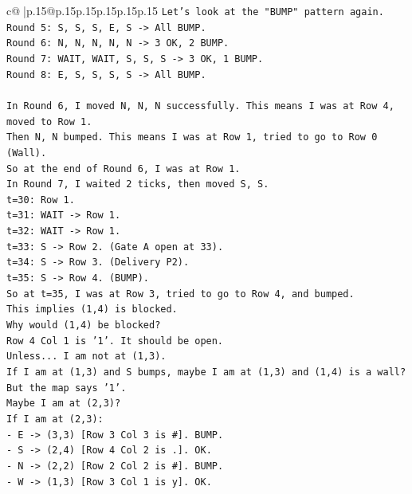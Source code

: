 \documentclass{article}
\begin{document}
{\begin{supertabular}{c@{$\;$}|p{.15\linewidth}@{}p{.15\linewidth}p{.15\linewidth}p{.15\linewidth}p{.15\linewidth}p{.15\linewidth}}
{{{\texttt{Let's look at the "BUMP" pattern again.} \\
\texttt{Round 5: S, S, S, E, S {-}> All BUMP.} \\
\texttt{Round 6: N, N, N, N, N {-}> 3 OK, 2 BUMP.} \\
\texttt{Round 7: WAIT, WAIT, S, S, S {-}> 3 OK, 1 BUMP.} \\
\texttt{Round 8: E, S, S, S, S {-}> All BUMP.} \\
\\ 
\texttt{In Round 6, I moved N, N, N successfully. This means I was at Row 4, moved to Row 1.} \\
\texttt{Then N, N bumped. This means I was at Row 1, tried to go to Row 0 (Wall).} \\
\texttt{So at the end of Round 6, I was at Row 1.} \\
\texttt{In Round 7, I waited 2 ticks, then moved S, S.} \\
\texttt{t=30: Row 1.} \\
\texttt{t=31: WAIT {-}> Row 1.} \\
\texttt{t=32: WAIT {-}> Row 1.} \\
\texttt{t=33: S {-}> Row 2. (Gate A open at 33).} \\
\texttt{t=34: S {-}> Row 3. (Delivery P2).} \\
\texttt{t=35: S {-}> Row 4. (BUMP).} \\
\texttt{So at t=35, I was at Row 3, tried to go to Row 4, and bumped.} \\
\texttt{This implies (1,4) is blocked.} \\
\texttt{Why would (1,4) be blocked?} \\
\texttt{Row 4 Col 1 is '1'. It should be open.} \\
\texttt{Unless... I am not at (1,3).} \\
\texttt{If I am at (1,3) and S bumps, maybe I am at (1,3) and (1,4) is a wall?} \\
\texttt{But the map says '1'.} \\
\texttt{Maybe I am at (2,3)?} \\
\texttt{If I am at (2,3):} \\
\texttt{{-} E {-}> (3,3) {[}Row 3 Col 3 is \#{]}. BUMP.} \\
\texttt{{-} S {-}> (2,4) {[}Row 4 Col 2 is .{]}. OK.} \\
\texttt{{-} N {-}> (2,2) {[}Row 2 Col 2 is \#{]}. BUMP.} \\
\texttt{{-} W {-}> (1,3) {[}Row 3 Col 1 is y{]}. OK.} \\
}}}
\end{supertabular}}
\end{document}
